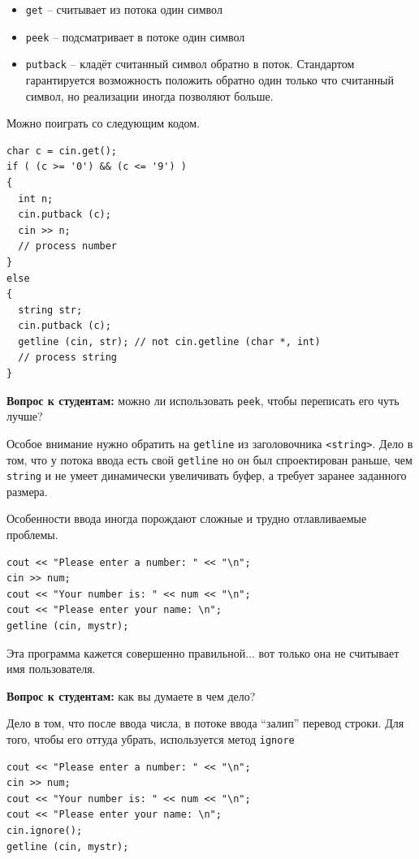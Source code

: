 \documentclass[a4paper,12pt,oneside]{book}
\newif\ifanswers
\begin{document}
\begin{itemize}
\item \lstinline!get! -- считывает из потока один символ 
\item \lstinline!peek! -- подсматривает в потоке один символ 
\item \lstinline!putback! -- кладёт считанный символ обратно в поток. Стандартом гарантируется возможность положить обратно один только что считанный символ, но реализации иногда позволяют больше.
\end{itemize}

Можно поиграть со следующим кодом.

\begin{lstlisting}
char c = cin.get();
if ( (c >= '0') && (c <= '9') ) 
{
  int n;
  cin.putback (c);
  cin >> n;
  // process number
} 
else 
{
  string str;
  cin.putback (c);
  getline (cin, str); // not cin.getline (char *, int)
  // process string
}
\end{lstlisting}

\textbf{Вопрос к студентам:} можно ли использовать \lstinline!peek!, чтобы переписать его чуть лучше?

\ifanswers
Правильный ответ:  да, конечно, тогда и \lstinline!putback! можно убрать.
\fi

Особое внимание нужно обратить на \lstinline!getline! из заголовочника \lstinline!<string>!. Дело в том, что у потока ввода есть свой \lstinline!getline! но он был спроектирован раньше, чем \lstinline!string! и не умеет динамически увеличивать буфер, а требует заранее заданного размера.

Особенности ввода иногда порождают сложные и трудно отлавливаемые проблемы.

\begin{lstlisting}
cout << "Please enter a number: " << "\n";
cin >> num;
cout << "Your number is: " << num << "\n";
cout << "Please enter your name: \n";
getline (cin, mystr);
\end{lstlisting}

Эта программа кажется совершенно правильной... вот только она не считывает имя пользователя.

\textbf{Вопрос к студентам:} как вы думаете в чем дело?

\ifanswers
Правильный ответ: см. ниже.
\fi

Дело в том, что после ввода числа, в потоке ввода ``залип'' перевод строки. Для того, чтобы его оттуда убрать, используется метод \lstinline!ignore!

\begin{lstlisting}
cout << "Please enter a number: " << "\n";
cin >> num;
cout << "Your number is: " << num << "\n";
cout << "Please enter your name: \n";
cin.ignore();
getline (cin, mystr);
\end{lstlisting}
\end{document}
